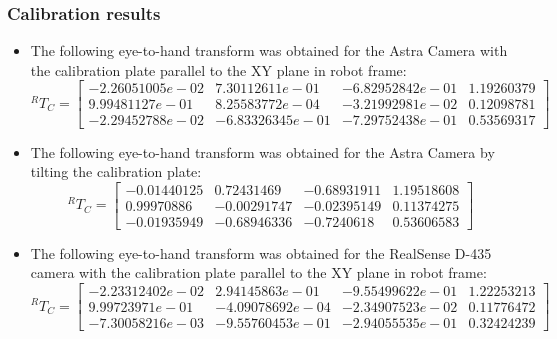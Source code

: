 \subsubsection{Calibration results}






\begin{itemize}
\item The following eye-to-hand transform was obtained for the Astra Camera with the calibration plate parallel to the XY plane in robot frame:
\begin{equation}
^{R}T_{C}=\begin{bmatrix} -2.26051005e-02 & 7.30112611e-01 & -6.82952842e-01 & 1.19260379\\9.99481127e-01 & 8.25583772e-04 & -3.21992981e-02 & 0.12098781\\ -2.29452788e-02 & -6.83326345e-01 & -7.29752438e-01 & 0.53569317 \end{bmatrix}
\end{equation}


				
\item The following eye-to-hand transform was obtained for the Astra Camera by tilting the calibration plate:
\begin{equation}
^{R}T_{C}=\begin{bmatrix} -0.01440125 & 0.72431469 & -0.68931911 & 1.19518608\\0.99970886 & -0.00291747 & -0.02395149 & 0.11374275\\ -0.01935949 & -0.68946336 & -0.7240618 & 0.53606583 \end{bmatrix}
\end{equation}



\item The following eye-to-hand transform was obtained for the RealSense D-435 camera with the calibration plate parallel to the XY plane in robot frame:
\begin{equation}
^{R}T_{C}=\begin{bmatrix} -2.23312402e-02 & 2.94145863e-01 & -9.55499622e-01 &1.22253213\\9.99723971e-01 & -4.09078692e-04 & -2.34907523e-02 & 0.11776472 \\ -7.30058216e-03 & -9.55760453e-01 & -2.94055535e-01 & 0.32424239  \end{bmatrix}
\end{equation}




\end{itemize}
